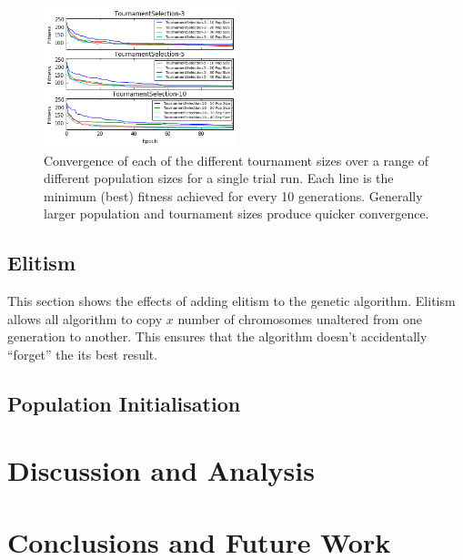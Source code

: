 \documentclass[journal]{IEEEtran}
\begin{document}
\begin{figure}[H]
\centering
\includegraphics[width=0.5\textwidth]{figures/selection_vs_pop_size_convergence.png}
\caption{Convergence of each of the different tournament sizes over a range of different population sizes for a single trial run. Each line is the minimum (best) fitness achieved for every 10 generations. Generally larger population and tournament sizes produce quicker convergence.}
\label{fig:tournament-selection-convergence}
\end{figure}

\subsection{Elitism}
This section shows the effects of adding elitism to the genetic algorithm. Elitism allows all algorithm to copy $x$ number of chromosomes unaltered from one generation to another. This ensures that the algorithm doesn't accidentally ``forget'' the its best result.

\subsection{Population Initialisation}



\section{Discussion and Analysis}
\section{Conclusions and Future Work}


\end{document}
